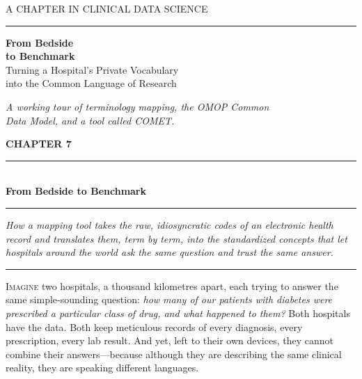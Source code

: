\documentclass[12pt,openany]{book}
\begin{document}
\raggedbottom

\thispagestyle{empty}
\vspace*{3.5cm}
\begin{flushright}
{\sffamily\color{cometgold}\Large A CHAPTER IN CLINICAL DATA SCIENCE}\\[4pt]
{\color{cometrule}\rule{0.62\linewidth}{1.2pt}}
\end{flushright}
\vspace{2.2cm}
\begin{flushright}
{\sffamily\bfseries\fontsize{34}{40}\selectfont\color{cometink} From Bedside\\ to Benchmark}\\[14pt]
{\sffamily\Large\color{cometbrown} Turning a Hospital's Private Vocabulary\\ into the Common Language of Research}
\end{flushright}
\vfill
\begin{flushright}
{\itshape\color{softgrey} A working tour of terminology mapping, the OMOP Common\\
Data Model, and a tool called COMET.}
\end{flushright}
\clearpage

\thispagestyle{empty}
\begin{flushleft}
{\sffamily\bfseries\color{cometgold}\Large CHAPTER 7}\\[2pt]
{\color{cometrule}\rule{\linewidth}{2.5pt}}\\[10pt]
{\sffamily\bfseries\fontsize{27}{31}\selectfont\color{cometink} From Bedside to Benchmark}\\[12pt]
{\color{cometrule}\rule{\linewidth}{0.8pt}}
\end{flushleft}
\vspace{4pt}
{\itshape\color{softgrey} How a mapping tool takes the raw, idiosyncratic codes of an electronic
health record and translates them, term by term, into the standardized concepts that let
hospitals around the world ask the same question and trust the same answer.}
\vspace{8pt}
{\color{cometrule}\rule{\linewidth}{0.8pt}}
\vspace{2pt}

\lettrine[lines=3,lhang=0.15,findent=2pt,nindent=4pt]{\color{cometbrown}I}{magine} two hospitals, a
thousand kilometres apart, each trying to answer the same simple-sounding question: \emph{how many
of our patients with diabetes were prescribed a particular class of drug, and what happened to them?}
Both hospitals have the data. Both keep meticulous records of every diagnosis, every prescription,
every lab result. And yet, left to their own devices, they cannot combine their answers---because
although they are describing the same clinical reality, they are speaking different languages.
\end{document}
